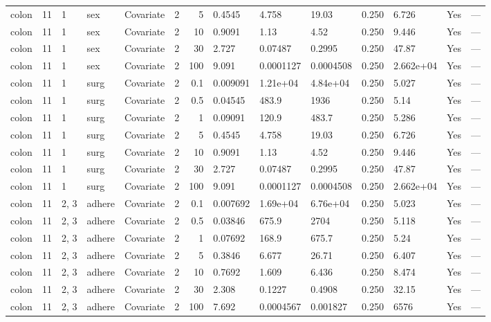 \begin{tabular}{lrlllrrlllllll}
  colon & 11 & 1 & sex & Covariate & 2 &     5 & 0.4545 & 4.758 & 19.03 & 0.250 & 6.726 & Yes & --- \\ 
  colon & 11 & 1 & sex & Covariate & 2 &    10 & 0.9091 & 1.13 & 4.52 & 0.250 & 9.446 & Yes & --- \\ 
  colon & 11 & 1 & sex & Covariate & 2 &    30 & 2.727 & 0.07487 & 0.2995 & 0.250 & 47.87 & Yes & --- \\ 
  colon & 11 & 1 & sex & Covariate & 2 &   100 & 9.091 & 0.0001127 & 0.0004508 & 0.250 & 2.662e+04 & Yes & --- \\ 
  colon & 11 & 1 & surg & Covariate & 2 &   0.1 & 0.009091 & 1.21e+04 & 4.84e+04 & 0.250 & 5.027 & Yes & --- \\ 
  colon & 11 & 1 & surg & Covariate & 2 &   0.5 & 0.04545 & 483.9 & 1936 & 0.250 & 5.14 & Yes & --- \\ 
  colon & 11 & 1 & surg & Covariate & 2 &     1 & 0.09091 & 120.9 & 483.7 & 0.250 & 5.286 & Yes & --- \\ 
  colon & 11 & 1 & surg & Covariate & 2 &     5 & 0.4545 & 4.758 & 19.03 & 0.250 & 6.726 & Yes & --- \\ 
  colon & 11 & 1 & surg & Covariate & 2 &    10 & 0.9091 & 1.13 & 4.52 & 0.250 & 9.446 & Yes & --- \\ 
  colon & 11 & 1 & surg & Covariate & 2 &    30 & 2.727 & 0.07487 & 0.2995 & 0.250 & 47.87 & Yes & --- \\ 
  colon & 11 & 1 & surg & Covariate & 2 &   100 & 9.091 & 0.0001127 & 0.0004508 & 0.250 & 2.662e+04 & Yes & --- \\ 
  colon & 11 & 2, 3 & adhere & Covariate & 2 &   0.1 & 0.007692 & 1.69e+04 & 6.76e+04 & 0.250 & 5.023 & Yes & --- \\ 
  colon & 11 & 2, 3 & adhere & Covariate & 2 &   0.5 & 0.03846 & 675.9 & 2704 & 0.250 & 5.118 & Yes & --- \\ 
  colon & 11 & 2, 3 & adhere & Covariate & 2 &     1 & 0.07692 & 168.9 & 675.7 & 0.250 & 5.24 & Yes & --- \\ 
  colon & 11 & 2, 3 & adhere & Covariate & 2 &     5 & 0.3846 & 6.677 & 26.71 & 0.250 & 6.407 & Yes & --- \\ 
  colon & 11 & 2, 3 & adhere & Covariate & 2 &    10 & 0.7692 & 1.609 & 6.436 & 0.250 & 8.474 & Yes & --- \\ 
  colon & 11 & 2, 3 & adhere & Covariate & 2 &    30 & 2.308 & 0.1227 & 0.4908 & 0.250 & 32.15 & Yes & --- \\ 
  colon & 11 & 2, 3 & adhere & Covariate & 2 &   100 & 7.692 & 0.0004567 & 0.001827 & 0.250 & 6576 & Yes & --- \\ 

\end{tabular}
